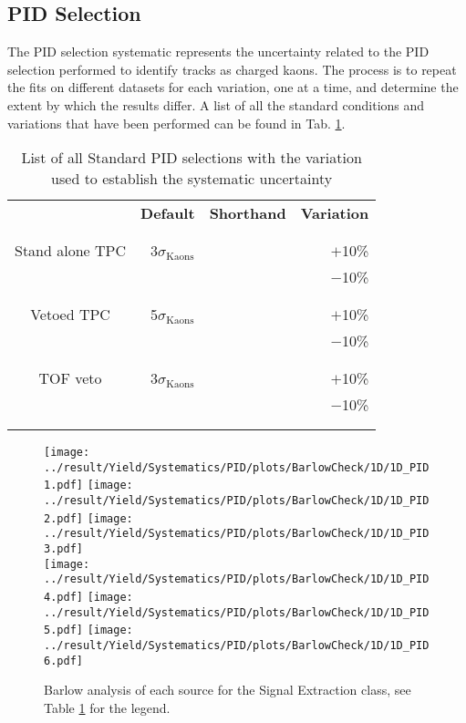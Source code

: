 \subsection{PID Selection}
The PID selection systematic represents the uncertainty related to the PID selection performed to identify tracks as charged kaons. The process is to repeat the fits on different datasets for each variation, one at a time, and determine the extent by which the results differ. A list of all the standard conditions and variations that have been performed can be found in Tab. \ref{tab:Syst_PID}.
\begin{table}
\center
\begin{tabular}{c|r|r|r}
					&\textbf{Default}							&\textbf{Shorthand}			&\textbf{Variation}		\\
					\\ \hline \\
Stand alone TPC		&3$\sigma_{\text{Kaons}}$					&\texttt{\blue{PID1}}			&$+$10\%\\
					&										&\texttt{\blue{PID2}}			&$-$10\%\\
					\\ \hline \\
Vetoed TPC			&5$\sigma_{\text{Kaons}}$					&\texttt{\blue{PID3}}			&$+$10\%\\
					&										&\texttt{\blue{PID4}}			&$-$10\%\\
					\\ \hline \\
TOF veto				&3$\sigma_{\text{Kaons}}$					&\texttt{\blue{PID5}}			&$+$10\%\\
					&										&\texttt{\blue{PID6}}			&$-$10\%\\
					\\ \hline \\

\end{tabular}
\caption{List of all Standard PID selections with the variation used to establish the systematic uncertainty}
\label{tab:Syst_PID}
\end{table}

\newpage
\begin{figure}
	\centering
		\texttt{[image: ../result/Yield/Systematics/PID/plots/BarlowCheck/1D/1D\_PID1.pdf]}
		\texttt{[image: ../result/Yield/Systematics/PID/plots/BarlowCheck/1D/1D\_PID2.pdf]}
		\texttt{[image: ../result/Yield/Systematics/PID/plots/BarlowCheck/1D/1D\_PID3.pdf]}\\
		\texttt{[image: ../result/Yield/Systematics/PID/plots/BarlowCheck/1D/1D\_PID4.pdf]}
		\texttt{[image: ../result/Yield/Systematics/PID/plots/BarlowCheck/1D/1D\_PID5.pdf]}
		\texttt{[image: ../result/Yield/Systematics/PID/plots/BarlowCheck/1D/1D\_PID6.pdf]}
		\caption{Barlow analysis of each source for the Signal Extraction class, see Table \ref{tab:Syst_PID} for the legend.}
		\label{fig:Barlow_PID_1D}
\end{figure}

